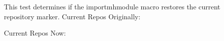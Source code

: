 \documentclass[minimal]{omdoc}
\begin{document}
This test determines if the importmhmodule macro restores the current repository marker. 
\makeatletter
\let\old@currentrepos=\mh@currentrepos
Current Repos Originally: \mh@currentrepos
\makeatother

\makeatletter
Current Repos Now: \mh@currentrepos
\ifx\mh@currentrepos\oldcurrentrepos
\PackageError{mathhub}{importmhmodule should reset the current repos}{}
\fi
\end{document}
